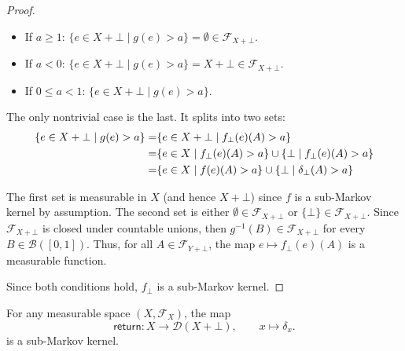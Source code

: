 \begin{proof}
	\begin{itemize}
		\item If $a \geq 1$: $\{e\in X+\bot \mid g(e)>a\} = \emptyset \in \mathcal{F}_{X + \bot}$.
		\item If $a < 0$: $\{e\in X+\bot \mid g(e)>a\} = X + \bot \in \mathcal{F}_{X + \bot}$.
		\item If $0 \leq a < 1$: $\{e \in X + \bot \mid g(e) > a \}$.
	\end{itemize}

	The only nontrivial case is the last. It splits into two sets:
	\begin{align*}
		\{e \in X + \bot \mid g(e) > a \} = &\{e \in X + \bot \mid f_{\bot}(e)(A) > a \} \\
		= &\{e \in X \mid f_{\bot}(e)(A) > a \} \cup \{\bot \mid f_{\bot}(e)(A) > a \} \\
		= &\{e \in X \mid f(e)(A) > a \} \cup \{\bot \mid \delta_{\bot}(A) > a \}
	\end{align*}

	The first set is measurable in $X$ (and hence $X + \bot$) since $f$ is a sub-Markov kernel by assumption. The second set is either $\emptyset \in \mathcal{F}_{X + \bot}$ or $\{\bot\} \in \mathcal{F}_{X + \bot}$. Since $ \mathcal{F}_{X + \bot}$ is closed under countable unions, then $g^{-1}(B) \in \mathcal{F}_{X + \bot}$ for every $B \in \mathcal{B}([0,1])$. Thus, for all $A \in \mathcal{F}_{Y + \bot}$, the map $e \mapsto f_{\bot}(e)(A)$ is a measurable function.
	
	\medskip
	
	Since both conditions hold, $f_{\bot}$ is a sub-Markov kernel.
\end{proof}

\begin{lemma}\label{lem:dirac-return-kernel}
	For any measurable space $(X,\mathcal{F}_X)$, the map
	\[
		\mathsf{return} : X \to \mathcal{D}(X+\bot),
		\qquad x \mapsto \delta_x .
	\]
	is a sub-Markov kernel.
\end{lemma}

